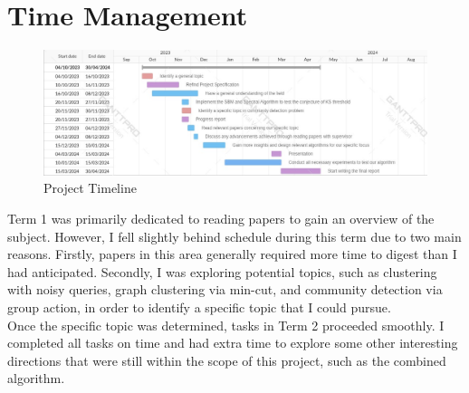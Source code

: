 \section{Time Management}
\begin{figure}[ht]
    \centering
    \includegraphics[width=1\linewidth]{Figures/Project Timeline.jpeg}
    \caption{Project Timeline}
    \label{fig:enter-label}
\end{figure}
Term 1 was primarily dedicated to reading papers to gain an overview of the subject. However, I fell slightly behind schedule during this term due to two main reasons. Firstly, papers in this area generally required more time to digest than I had anticipated. Secondly, I was exploring potential topics, such as clustering with noisy queries, graph clustering via min-cut, and community detection via group action, in order to identify a specific topic that I could pursue.\\
Once the specific topic was determined, tasks in Term 2 proceeded smoothly. I completed all tasks on time and had extra time to explore some other interesting directions that were still within the scope of this project, such as the combined algorithm.
